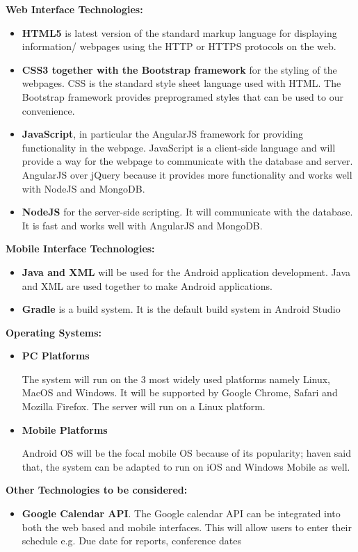 \documentclass{article}
\begin{document}
		\textbf{Web Interface Technologies:}\par
		\begin{itemize}
		
		\item \textbf{HTML5} is latest version of the standard markup language for displaying information/ webpages using the HTTP or HTTPS protocols on the web. 
\item \textbf{CSS3 together with the Bootstrap framework} for the styling of the webpages. CSS is the standard style sheet language used with HTML. The Bootstrap framework provides preprogramed styles that can be used to our convenience.
\item \textbf{JavaScript}, in particular the AngularJS framework for providing functionality in the webpage. JavaScript is a client-side language and will provide a way for the webpage to communicate with the database and server. AngularJS over jQuery because it provides more functionality and works well with NodeJS and MongoDB.
\item \textbf{NodeJS} for the server-side scripting. It will communicate with the database. It is fast and works well with AngularJS and MongoDB.
\end{itemize}

\textbf{Mobile Interface Technologies:}\par
\begin{itemize}
\item \textbf{Java and XML} will be used for the Android application development. Java and XML are used together to make Android applications.
\item \textbf{Gradle} is a build system. It is the default build system in Android Studio
\end{itemize}
\textbf{Operating Systems:}\par
\begin{itemize}
\item \textbf{PC Platforms} \par
The system will run on the 3 most widely used platforms namely Linux, MacOS and Windows. It will be supported by Google Chrome, Safari and Mozilla Firefox. The server will run on a Linux platform.
\item \textbf{Mobile Platforms} \par
Android OS will be the focal mobile OS because of its popularity; haven said that, the system can be adapted to run on iOS and Windows Mobile as well.
\end{itemize}
\textbf{Other Technologies to be considered:}\par
\begin{itemize}
\item \textbf{Google Calendar API}. The Google calendar API can be integrated into both the web based and mobile interfaces. This will allow users to enter their schedule e.g. Due date for reports, conference dates
\end{itemize}
\end{document}
